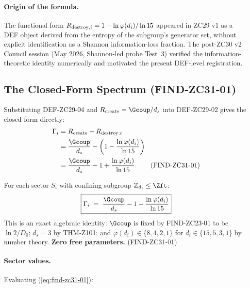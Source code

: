\documentclass[12pt, a4paper]{article}
\begin{document}
\paragraph{Origin of the formula.}
The functional form
$R_{{\rm destroy},i} = 1 - \ln \varphi(d_i)/\ln 15$
appeared in ZC29 v1 as a DEF object derived from the entropy
of the subgroup's generator set, without explicit identification
as a Shannon information-loss fraction. The post-ZC30 v2
Council session (May 2026, Shannon-led probe Test~3) verified
the information-theoretic identity numerically and motivated
the present DEF-level registration.

\subsection{The Closed-Form Spectrum (FIND-ZC31-01)}
\label{sec:spectrum}

Substituting DEF-ZC29-04 and $R_{\rm create} = \Gcoup/d_s$
into DEF-ZC29-02 gives the closed form directly:
\begin{align}
  \Gamma_i
    &= R_{\rm create} - R_{{\rm destroy},i}\notag\\
    &= \frac{\Gcoup}{d_s}
       - \left(1 - \frac{\ln\varphi(d_i)}{\ln 15}\right)\notag\\
    &= \frac{\Gcoup}{d_s} - 1
       + \frac{\ln\varphi(d_i)}{\ln 15}.
  \tag{FIND-ZC31-01}\label{eq:find-zc31-01}
\end{align}

\begin{derivedbox}[title={FIND-ZC31-01: Closed-form sector
  spectrum (exact)}]
For each sector $S_i$ with confining subgroup
$\mathbb{Z}_{d_i} \leq \Zft$:
\begin{equation*}
  \boxed{
    \Gamma_i
    \;=\; \frac{\Gcoup}{d_s} - 1
       + \frac{\ln\varphi(d_i)}{\ln 15}
  }
\end{equation*}
This is an exact algebraic identity: $\Gcoup$ is fixed by
FIND-ZC23-01 to be $\ln 2 / D_0$; $d_s = 3$ by THM-Z101; and
$\varphi(d_i) \in \{8, 4, 2, 1\}$ for $d_i \in \{15, 5, 3, 1\}$
by number theory. \textbf{Zero free parameters.}
\hfill\textup{(FIND-ZC31-01)}
\end{derivedbox}

\paragraph{Sector values.} Evaluating (\ref{eq:find-zc31-01}):
\end{document}
